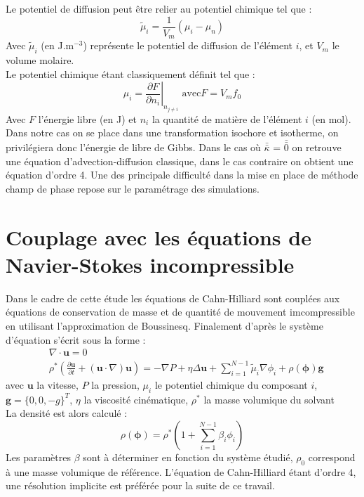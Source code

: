 \documentclass[a4paper,11pt,fleqn]{report}    %
\newcommand{\doubleoverline}[1]{\bar{\bar{#1}}} 			%
\begin{document}
Le potentiel de diffusion peut être relier au potentiel chimique tel que :
\begin{equation}
	\tilde{\mu}_i = \frac{1}{V_m}\left(\mu_i - \mu_n\right)
\end{equation}
Avec $\tilde{\mu}_i$ (en J.m$^{-3}$) représente le potentiel de diffusion de l'élément $i$, et $V_m$ le volume molaire.\\
Le potentiel chimique étant classiquement définit tel que :
\begin{equation}
	\mu_i = \left.\frac{\partial F}{\partial n_i}\right|_{n_{j\neq i }}
	  \textrm{                        avec} F = V_m f_0
\end{equation}
Avec $F$ l'énergie libre (en J) et $n_i$ la quantité de matière de l'élément $i$ (en mol). Dans notre cas on se place dans une transformation isochore et isotherme, on privilégiera donc l'énergie de libre de Gibbs.
Dans le cas où $\doubleoverline{\kappa}$ = $\doubleoverline{0}$ on retrouve une équation d'advection-diffusion classique, dans le cas contraire on obtient une équation d'ordre 4. Une des principale difficulté dans la mise en place de méthode champ de phase repose sur le paramétrage des simulations.
\section{Couplage avec les équations de Navier-Stokes incompressible}
Dans le cadre de cette étude les équations de Cahn-Hilliard sont couplées aux équations de conservation de masse et de quantité de mouvement imcompressible en utilisant l'approximation de Boussinesq. Finalement d'après \cite{kim_phase-field_2012} le système d'équation s'écrit sous la forme :
\begin{align}
&\nabla \cdot \mathbf{u} = 0\\
&\rho^* \left (\frac{\partial \mathbf{u}}{\partial t} + (\mathbf{u} \cdot {\nabla})\mathbf{u}\right) = -{\nabla} P +\eta \Delta \mathbf{u}+\sum_{i=1}^{N-1} \tilde{\mu}_i{\nabla} \phi_i + \rho(\bm{\phi}) \mathbf{g}
\end{align}
avec $\mathbf{u}$ la vitesse, $P$ la pression, $\mu_i$ le potentiel chimique du composant $i$, $\mathbf{g} = \{ 0,0,-g\}^T $, $\eta$ la viscosité cinématique, $\rho^*$ la masse volumique du solvant\\
La densité est alors calculé : 
\begin{equation}
	\rho(\bm{\phi}) = \rho^*\left(1+\sum_{i=1}^{N-1}\beta_i \phi_i\right)
\end{equation}
Les paramètres $\beta$ sont à déterminer en fonction du système étudié, $\rho_0$ correspond à une masse volumique de référence. L'équation de Cahn-Hilliard étant d'ordre 4, une résolution implicite est préférée pour la suite de ce travail.
\end{document}
